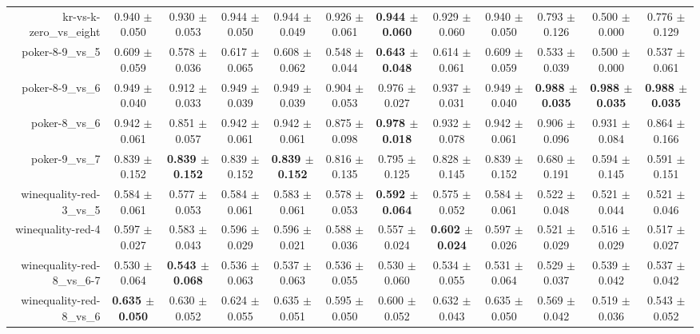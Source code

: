 \begin{table}[!ht]
{\begin{tabular}{r c c c c c c c c c c c}
kr-vs-k-zero\_vs\_eight & 0.940 $\pm$ 0.050 & 0.930 $\pm$ 0.053 & 0.944 $\pm$ 0.050 & 0.944 $\pm$ 0.049 & 0.926 $\pm$ 0.061 & \textbf{0.944 $\pm$ 0.060} & 0.929 $\pm$ 0.060 & 0.940 $\pm$ 0.050 & 0.793 $\pm$ 0.126 & 0.500 $\pm$ 0.000 & 0.776 $\pm$ 0.129 \\
poker-8-9\_vs\_5 & 0.609 $\pm$ 0.059 & 0.578 $\pm$ 0.036 & 0.617 $\pm$ 0.065 & 0.608 $\pm$ 0.062 & 0.548 $\pm$ 0.044 & \textbf{0.643 $\pm$ 0.048} & 0.614 $\pm$ 0.061 & 0.609 $\pm$ 0.059 & 0.533 $\pm$ 0.039 & 0.500 $\pm$ 0.000 & 0.537 $\pm$ 0.061 \\
poker-8-9\_vs\_6 & 0.949 $\pm$ 0.040 & 0.912 $\pm$ 0.033 & 0.949 $\pm$ 0.039 & 0.949 $\pm$ 0.039 & 0.904 $\pm$ 0.053 & 0.976 $\pm$ 0.027 & 0.937 $\pm$ 0.031 & 0.949 $\pm$ 0.040 & \textbf{0.988 $\pm$ 0.035} & \textbf{0.988 $\pm$ 0.035} & \textbf{0.988 $\pm$ 0.035} \\
poker-8\_vs\_6 & 0.942 $\pm$ 0.061 & 0.851 $\pm$ 0.057 & 0.942 $\pm$ 0.061 & 0.942 $\pm$ 0.061 & 0.875 $\pm$ 0.098 & \textbf{0.978 $\pm$ 0.018} & 0.932 $\pm$ 0.078 & 0.942 $\pm$ 0.061 & 0.906 $\pm$ 0.096 & 0.931 $\pm$ 0.084 & 0.864 $\pm$ 0.166 \\
poker-9\_vs\_7 & 0.839 $\pm$ 0.152 & \textbf{0.839 $\pm$ 0.152} & 0.839 $\pm$ 0.152 & \textbf{0.839 $\pm$ 0.152} & 0.816 $\pm$ 0.135 & 0.795 $\pm$ 0.125 & 0.828 $\pm$ 0.145 & 0.839 $\pm$ 0.152 & 0.680 $\pm$ 0.191 & 0.594 $\pm$ 0.145 & 0.591 $\pm$ 0.151 \\
winequality-red-3\_vs\_5 & 0.584 $\pm$ 0.061 & 0.577 $\pm$ 0.053 & 0.584 $\pm$ 0.061 & 0.583 $\pm$ 0.061 & 0.578 $\pm$ 0.053 & \textbf{0.592 $\pm$ 0.064} & 0.575 $\pm$ 0.052 & 0.584 $\pm$ 0.061 & 0.522 $\pm$ 0.048 & 0.521 $\pm$ 0.044 & 0.521 $\pm$ 0.046 \\
winequality-red-4 & 0.597 $\pm$ 0.027 & 0.583 $\pm$ 0.043 & 0.596 $\pm$ 0.029 & 0.596 $\pm$ 0.021 & 0.588 $\pm$ 0.036 & 0.557 $\pm$ 0.024 & \textbf{0.602 $\pm$ 0.024} & 0.597 $\pm$ 0.026 & 0.521 $\pm$ 0.029 & 0.516 $\pm$ 0.029 & 0.517 $\pm$ 0.027 \\
winequality-red-8\_vs\_6-7 & 0.530 $\pm$ 0.064 & \textbf{0.543 $\pm$ 0.068} & 0.536 $\pm$ 0.063 & 0.537 $\pm$ 0.063 & 0.536 $\pm$ 0.055 & 0.530 $\pm$ 0.060 & 0.534 $\pm$ 0.055 & 0.531 $\pm$ 0.064 & 0.529 $\pm$ 0.037 & 0.539 $\pm$ 0.042 & 0.537 $\pm$ 0.042 \\
winequality-red-8\_vs\_6 & \textbf{0.635 $\pm$ 0.050} & 0.630 $\pm$ 0.052 & 0.624 $\pm$ 0.055 & 0.635 $\pm$ 0.051 & 0.595 $\pm$ 0.050 & 0.600 $\pm$ 0.052 & 0.632 $\pm$ 0.043 & 0.635 $\pm$ 0.050 & 0.569 $\pm$ 0.042 & 0.519 $\pm$ 0.036 & 0.543 $\pm$ 0.052 \\

\end{tabular}}
\end{table}
